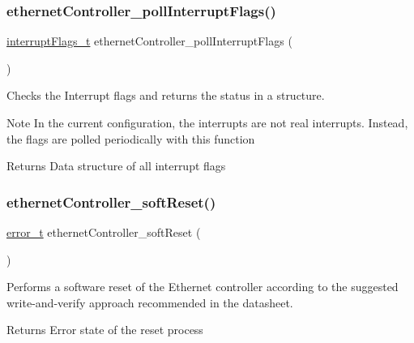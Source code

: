 \subsubsection{\texorpdfstring{ethernetController\_pollInterruptFlags()}{ethernetController\_pollInterruptFlags()}}
{\footnotesize\ttfamily \mbox{\hyperlink{group__interrupts_ga337298055be267e726930c9fc6b2d4eb}{interrupt\+Flags\+\_\+t}} ethernet\+Controller\+\_\+poll\+Interrupt\+Flags (\begin{DoxyParamCaption}{ }\end{DoxyParamCaption})}



Checks the Interrupt flags and returns the status in a structure. 

\begin{DoxyNote}{Note}
In the current configuration, the interrupts are not real interrupts. Instead, the flags are polled periodically with this function 
\end{DoxyNote}
\begin{DoxyReturn}{Returns}
Data structure of all interrupt flags 
\end{DoxyReturn}
\mbox{\label{group__init_ga6a772ec407e60e921bad4db7a2be2676}} 
\subsubsection{\texorpdfstring{ethernetController\_softReset()}{ethernetController\_softReset()}}
{\footnotesize\ttfamily \mbox{\hyperlink{group__error_gad3ae44be85fe6952dcaed425499e8f6b}{error\+\_\+t}} ethernet\+Controller\+\_\+soft\+Reset (\begin{DoxyParamCaption}{ }\end{DoxyParamCaption})}



Performs a software reset of the Ethernet controller according to the suggested write-\/and-\/verify approach recommended in the datasheet. 

\begin{DoxyReturn}{Returns}
Error state of the reset process 
\end{DoxyReturn}
\mbox{\label{group__init_gab294a8fbc5b11d40a5da5e769110f6ca}} 
